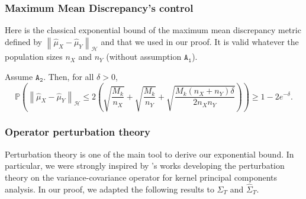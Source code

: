 \documentclass[twoside,11pt]{article}
\newcommand{\Hk}{\mathcal{H}}
\newcommand{\PPO}{\mathbb{P} }
\newcommand{\ST}{\Sigma_{T}}
\newcommand{\hST}{\widehat{\Sigma}_{T}}
\newcommand{\A}[1]{$\mathtt{A_#1}$}
\begin{document}
\subsubsection*{Maximum Mean Discrepancy's control} 
Here is the classical exponential bound of the maximum mean discrepancy metric defined by $\left \| \widehat{\mu}_X - \widehat{\mu}_Y \right \|_{\Hk}$ and that we used in our proof. It is valid whatever the population sizes $n_X$ and $n_Y$ (without assumption \A{1}). 
\begin{theorem}
Assume \A{2}. Then, for all $\delta>0$, 
\begin{equation*}
     \PPO \left( \left \| \widehat{\mu}_X - \widehat{\mu}_Y \right \|_{\Hk} \leq 2 \left( \sqrt{\frac{M_k}{n_X}} + \sqrt{\frac{M_k}{n_Y}} + \sqrt{\frac{M_k (n_X+n_Y) \delta}{2 n_X n_Y}} \right) \right) \geq 1 - 2 e^{-\delta}.
\end{equation*}
\label{Gretton}
\end{theorem}
\subsubsection*{Operator perturbation theory} 
Perturbation theory is one of the main tool to derive our exponential bound. In particular, we were strongly inspired by \citep{koltchinskii2000random,blanchard2007statistical,zwald2005convergence}'s works developing the perturbation theory on the variance-covariance operator for kernel principal components analysis. 
In our proof, we adapted the following results to $\ST$ and $\hST$.
\end{document}
